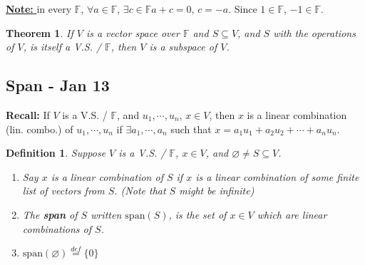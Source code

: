 \documentclass[12pt]{article}
\newtheorem{theorem}{Theorem}[subsection]
\newtheorem{definition}{Definition}[subsection]
\newcommand{\Span}{\mathrm{span}}
\newcommand{\mF}{{\mathbb{F}}}
\let\emptyset\varnothing
\begin{document}
	\underline{\textbf{Note: }}
	in every $\mathbb{F}$, $\forall a \in \mathbb{F}$,
	$\exists c \in \mathbb{F}$$a+c=0$, $c = -a$. 
	Since $1\in \mathbb{F}$, $-1\in \mathbb{F}$.\\

	\begin{theorem}
		If $V$ is a vector space over $\mathbb{F}$ and $S \subseteq V$, 
		and $S$ with the operations of $V$, is itself a V.S. / $\mathbb{F}$, 
		then $V$ is a subspace of $V$. 
	\end{theorem}
	




	\newpage
	\subsection{Span - Jan 13}
	\textbf{Recall:}
	If $V$ is a V.S. / $\mF$, and $u_1, \cdots, u_n$, $x\in V$, then 
	$x$ is a linear combination (lin. combo.) of $u_1, \cdots, u_n$ if 
	$\exists a_1, \cdots, a_n$ such that $x=a_1u_1+a_2u_2+\cdots+a_nu_n$.\\

	\begin{definition}
		Suppose $V$ is a V.S. / $\mF$, $x \in V$, and 
		$\emptyset \neq S \subseteq V$.
		\begin{enumerate}
			\item 
				Say $x$ is a linear combination of $S$ if $x$ is a linear 
				combination of some finite list of vectors from $S$. 
				(Note that $S$ might be infinite)

			\item The \textbf{span} of $S$ written $\Span(S)$, is the set of
				$x \in V$ which are linear combinations of $S$. 
			\item $\Span(\emptyset) \overset{def}{=} \{0\}$\\
		\end{enumerate}
	\end{definition}
\end{document}
